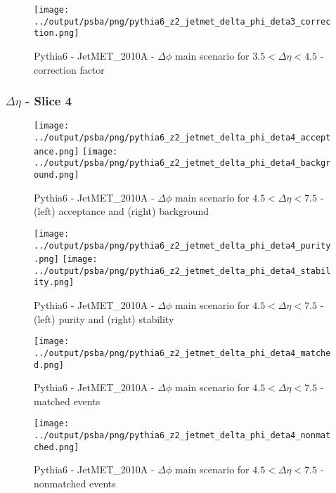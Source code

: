 \documentclass[11pt]{book}
\begin{document}
\begin{figure}[ht]
\centering
\texttt{[image: ../output/psba/png/pythia6\_z2\_jetmet\_delta\_phi\_deta3\_correction.png]}
\caption{Pythia6 - JetMET\_2010A - $\Delta\phi$ main scenario for $3.5 < \Delta\eta < 4.5$ - correction factor}
\label{fig:p6_jetmet_delta_phi_deta3_correction}
\end{figure}

\clearpage
\subsubsection{$\Delta\eta$ - Slice 4}

\begin{figure}[ht]
\centering
\texttt{[image: ../output/psba/png/pythia6\_z2\_jetmet\_delta\_phi\_deta4\_acceptance.png]}
\texttt{[image: ../output/psba/png/pythia6\_z2\_jetmet\_delta\_phi\_deta4\_background.png]}
\caption{Pythia6 - JetMET\_2010A - $\Delta\phi$ main scenario for $4.5 < \Delta\eta < 7.5$ - (left) acceptance and (right) background}
\label{fig:p6_jetmet_delta_phi_deta4_ab}
\end{figure}

\begin{figure}[ht]
\centering
\texttt{[image: ../output/psba/png/pythia6\_z2\_jetmet\_delta\_phi\_deta4\_purity.png]}
\texttt{[image: ../output/psba/png/pythia6\_z2\_jetmet\_delta\_phi\_deta4\_stability.png]}
\caption{Pythia6 - JetMET\_2010A - $\Delta\phi$ main scenario for $4.5 < \Delta\eta < 7.5$ - (left) purity and (right) stability}
\label{fig:p6_jetmet_delta_phi_deta4_ps}
\end{figure}

\begin{figure}[ht]
\centering
\texttt{[image: ../output/psba/png/pythia6\_z2\_jetmet\_delta\_phi\_deta4\_matched.png]}
\caption{Pythia6 - JetMET\_2010A - $\Delta\phi$ main scenario for $4.5 < \Delta\eta < 7.5$ - matched events}
\label{fig:p6_jetmet_delta_phi_deta4_matched}
\end{figure}

\begin{figure}[ht]
\centering
\texttt{[image: ../output/psba/png/pythia6\_z2\_jetmet\_delta\_phi\_deta4\_nonmatched.png]}
\caption{Pythia6 - JetMET\_2010A - $\Delta\phi$ main scenario for $4.5 < \Delta\eta < 7.5$ - nonmatched events}
\label{fig:p6_jetmet_delta_phi_deta4_nonmatched}
\end{figure}
\end{document}
